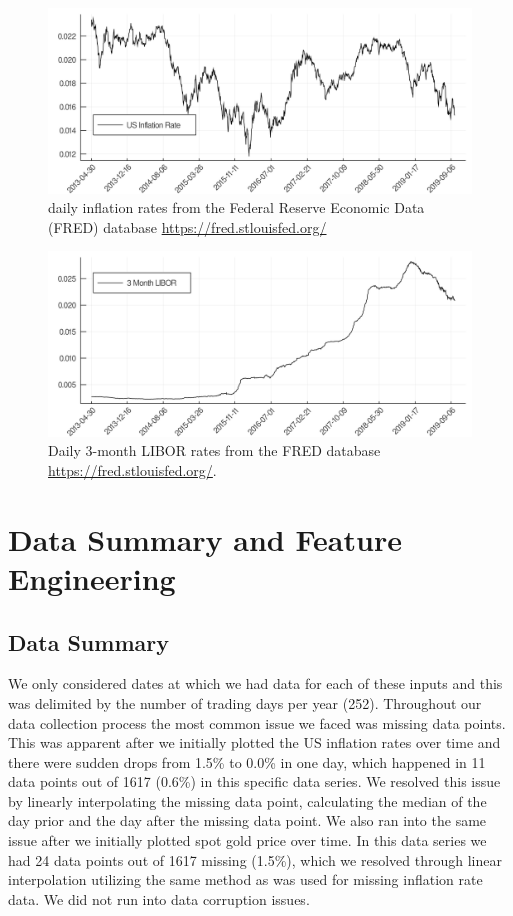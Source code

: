 \documentclass[9pt,twocolumn,twoside]{ilcss}
\begin{document}
\begin{figure}[tbhp]
\centering
\includegraphics[width=.9\linewidth]{US_inflation_rate.png}
\caption{daily inflation rates from the Federal Reserve Economic Data (FRED) database \url{https://fred.stlouisfed.org/}}
\label{fig:2}
\end{figure}

\begin{figure}[tbhp]
\centering
\includegraphics[width=.9\linewidth]{3_month_LIBOR.png}
\caption{Daily 3-month LIBOR rates from the FRED database \url{https://fred.stlouisfed.org/}.}
\label{fig:3}
\end{figure}

\section{Data Summary and Feature Engineering}
\subsection*{Data Summary}
We only considered dates at which we had data for each of these inputs and this was delimited by the number of trading days per year (252). Throughout our data collection process the most common issue we faced was missing data points. This was apparent after we initially plotted the US inflation rates over time and there were sudden drops from 1.5\% to 0.0\% in one day, which happened in 11 data points out of 1617 (0.6\%) in this specific data series. We resolved this issue by linearly interpolating the missing data point, calculating the median of the day prior and the day after the missing data point. We also ran into the same issue after we initially plotted spot gold price over time. In this data series we had 24 data points out of 1617 missing (1.5\%), which we resolved through linear interpolation utilizing the same method as was used for missing inflation rate data. We did not run into data corruption issues.
\end{document}
